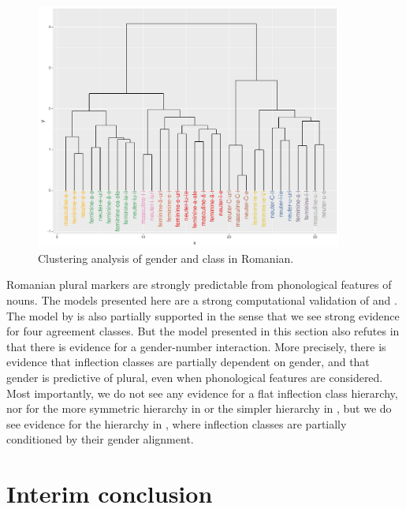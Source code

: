 \begin{figure}[!ptbh]
  \centering
  \includegraphics[width=0.9\textwidth]{./figures/romanian/romanian-clust.pdf}
  \caption{Clustering analysis of gender and class in Romanian.}\label{fig:romanian-clust-class-2}
\end{figure}

Romanian plural markers are strongly predictable from phonological features of nouns. The models presented here are a strong computational validation of \textcite{Vrabie.1989} and \textcite{Vrabie.2000}. The model by \textcite{Bateman.2010} is also partially supported in the sense that we see strong evidence for four agreement classes. But the model presented in this section also refutes \citeauthor{Bateman.2010} in that there is evidence for a gender-number interaction. More precisely, there is evidence that inflection classes are partially dependent on gender, and that gender is predictive of plural, even when phonological features are considered. Most importantly, we do not see any evidence for a flat inflection class hierarchy, nor for the more symmetric hierarchy in  or the simpler hierarchy in , but we do see evidence for the hierarchy in , where inflection classes are partially conditioned by their gender alignment.


\section{Interim conclusion}

